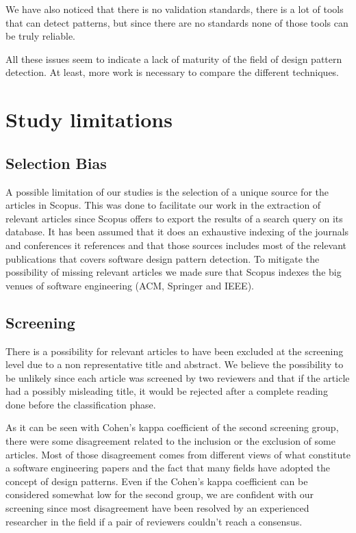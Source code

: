 \documentclass[letterpaper, 10 pt, conference]{ieeeconf}  %
\begin{document}
We have also noticed that there is no validation standards, there is a lot
of tools that can detect patterns, but since there are no standards 
none of those tools can be truly reliable.

All these issues seem to indicate a lack of maturity of the field of design
pattern detection.
At least, more work is necessary to compare the different techniques.


\section{Study limitations}

\subsection{Selection Bias}

A possible limitation of our studies is the selection of a unique source for 
the articles in Scopus.
This was done to facilitate our work in the extraction of relevant articles
since Scopus offers to export the results of a search query on its database.
It has been assumed that it does an exhaustive indexing of the journals
and conferences it references and that those sources includes most of the
relevant publications that covers software design pattern detection.
To mitigate the possibility of missing relevant articles we made sure that
Scopus indexes the big venues of software engineering (ACM, Springer and IEEE).

\subsection{Screening}

There is a possibility for relevant articles to have been excluded at the
screening level due to a non representative title and abstract.
We believe the possibility to be unlikely since each article was screened by
two reviewers and that if the article had a possibly misleading title, it would
be rejected after a complete reading done before the classification phase.

As it can be seen with Cohen's kappa coefficient of the second screening group,
there were some disagreement related to the inclusion or the exclusion of some
articles.
Most of those disagreement comes from different views of what constitute a
software engineering papers and the fact that many fields have adopted the
concept of design patterns.
Even if the Cohen's kappa coefficient can be considered somewhat low for the
second group, we are confident with our screening since most disagreement have
been resolved by an experienced researcher in the field if a pair of reviewers
couldn't reach a consensus.
\end{document}
